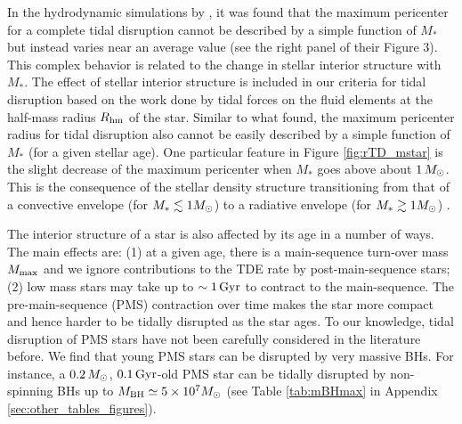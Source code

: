 \documentclass[useAMS,usenatbib]{mn2e}
\def\msun{M_{\rm \odot}}
\def\mstar{M_*}
\def\mBH{M_{\rm BH}}
\def\Rhm{R_{\rm hm}}
\begin{document}
In the hydrodynamic simulations by \cite{Ryu2020a}, it was found that the maximum pericenter for a complete tidal disruption cannot be described by a simple function of $\mstar$ but instead varies near an average value (see the right panel of their Figure 3). This complex behavior is related to the change in stellar interior structure with $\mstar$. The effect of stellar interior structure is included in our criteria for tidal disruption based on the work done by tidal forces on the fluid elements at the half-mass radius $\Rhm$ of the star.
Similar to what \cite{Ryu2020a} found, the maximum pericenter radius for tidal disruption also cannot be easily described by a simple function of $\mstar$ (for a given stellar age). One particular feature in Figure \ref{fig:rTD_mstar} is the slight decrease of the maximum pericenter when $\mstar$ goes above about $1\,\msun$. This is the consequence of the stellar density structure transitioning from that of a convective envelope (for $\mstar\lesssim 1\msun$) to a radiative envelope (for $\mstar\gtrsim 1\msun$) \citep{Kippenhahn2013}.

The interior structure of a star is also affected by its age in a number of ways. The main effects are: (1) at a given age, there is a main-sequence turn-over mass $M_{\rm max}$ and we ignore contributions to the TDE rate by post-main-sequence stars; (2) low mass stars may take up to $\sim 1\rm\, Gyr$ to contract to the main-sequence. The pre-main-sequence (PMS) contraction over time makes the star more compact and hence harder to be tidally disrupted as the star ages. To our knowledge, tidal disruption of PMS stars have not been carefully considered in the literature before. We find that young PMS stars can be disrupted by very massive BHs. For instance, a $0.2\,\msun$, $0.1\rm\,Gyr$-old PMS star can be tidally disrupted by non-spinning BHs up to $\mBH \simeq 5\times10^7\msun$ (see Table \ref{tab:mBHmax} in Appendix \ref{sec:other_tables_figures}).



\end{document}
